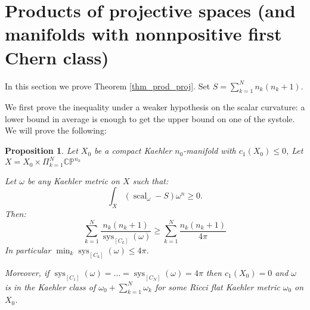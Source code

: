 \documentclass{amsart}
\newtheorem{proposition}[theorem]{Proposition}
\numberwithin{equation}{section}
\theoremstyle {definition}
\DeclareMathOperator{\scal}{scal}
\DeclareMathOperator{\sys}{sys}
\begin{document}
\section{Products of projective spaces (and manifolds with nonnpositive first Chern class)}

In this section we prove Theorem \ref{thm_prod_proj}.
Set $S=\sum_{k=1}^N n_k(n_k+1)$.

We first prove the inequality under a weaker hypothesis on the scalar curvature: a lower bound in average is enough to get the upper bound on one of the systole. We will prove the following:
\begin{proposition}
    \label{thm_prod_proj_avg}
    Let $X_0$ be a compact Kaehler $n_0$-manifold with $c_1(X_0)\leq 0$, %
    Let $X=X_0\times\Pi_{k=1}^N\mathbb{CP}^{n_k}$ %

    Let $\omega$ be any Kaehler metric on $X$ such that:
    \[\int_X(\scal_\omega-S)\omega^n\geq 0.\]
    Then:
    \[\sum_{k=1}^N\frac{n_k(n_k+1)}{\sys_{[C_k]}(\omega)}\geq \sum_{k=1}^N \frac{n_k(n_k+1)}{4\pi}\]
    In particular $\min_k \sys_{[C_k]}(\omega) \leq 4\pi$.

    Moreover, if $\sys_{[C_1]}(\omega)=\dots= \sys_{[C_N]}(\omega)=4\pi$ then $c_1(X_0)=0$ and $\omega$ is in the Kaehler class of $\omega_0+\sum_{k=1}^N\omega_k$ for some Ricci flat Kaehler metric $\omega_0$ on $X_0$.
\end{proposition}
\end{document}
